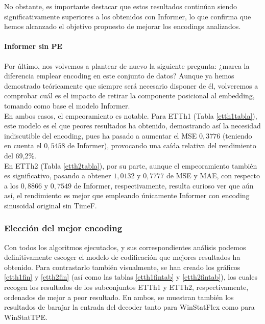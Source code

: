  No obstante, es importante destacar que estos resultados continúan siendo significativamente superiores a los obtenidos con Informer, lo que confirma que hemos alcanzado el objetivo propuesto de mejorar los encodings analizados.
 
 \paragraph{Informer sin PE}
 
Por último, nos volvemos a plantear de nuevo la siguiente pregunta: ¿marca la diferencia emplear encoding en este conjunto de datos? Aunque ya hemos demostrado teóricamente que siempre será necesario disponer de él, volveremos a comprobar cuál es el impacto de retirar la componente posicional al embedding, tomando como base el modelo Informer.\\
 
En ambos casos, el empeoramiento es notable. Para ETTh1 (Tabla \ref{etth1tabla}), este modelo es el que peores resultados ha obtenido, demostrando así la necesidad indiscutible del encoding, pues ha pasado a aumentar el MSE $0,3776$ (teniendo en cuenta el $0,5458$ de Informer), provocando una caída relativa del rendimiento del 69,2\%.\\

En ETTh2 (Tabla \ref{etth2tabla}), por su parte, aunque el empeoramiento también es significativo, pasando a obtener $1,0132$ y $0,7777$ de MSE  y MAE, con respecto a los $0,8866$ y $0,7549$ de Informer, respectivamente, resulta curioso ver que aún así, el rendimiento es mejor que empleando únicamente Informer con encoding sinusoidal original sin TimeF. 

\subsubsection{Elección del mejor encoding}

Con todos los algoritmos ejecutados, y sus correspondientes análisis podemos definitivamente escoger el modelo de codificación que mejores resultados ha obtenido. Para contrastarlo también visualmente, se han creado los gráficos \ref{etth1fin} y \ref{etth2fin} (así como las tablas \ref{etth1fintab} y \ref{etth2fintab}), los cuales recogen los resultados de los subconjuntos ETTh1 y ETTh2, respectivamente, ordenados de mejor a peor resultado. En ambos, se muestran también los resultados de barajar la entrada del decoder tanto para WinStatFlex como para WinStatTPE.\\



